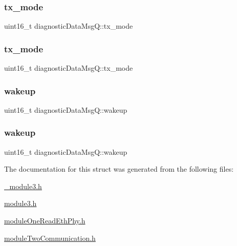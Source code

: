 \subsubsection{\texorpdfstring{tx\+\_\+mode}{tx\_mode}\hspace{0.1cm}{\footnotesize\ttfamily [1/2]}}
{\footnotesize\ttfamily uint16\+\_\+t diagnostic\+Data\+Msg\+Q\+::tx\+\_\+mode}

\mbox{\label{structdiagnostic_data_msg_q_acc9c509a517ee2079aa6ff9de27c61a4}} 
\subsubsection{\texorpdfstring{tx\+\_\+mode}{tx\_mode}\hspace{0.1cm}{\footnotesize\ttfamily [2/2]}}
{\footnotesize\ttfamily uint16\+\_\+t diagnostic\+Data\+Msg\+Q\+::tx\+\_\+mode}

\mbox{\label{structdiagnostic_data_msg_q_a8af90f2f6077250420f9c4830906a82f}} 
\subsubsection{\texorpdfstring{wakeup}{wakeup}\hspace{0.1cm}{\footnotesize\ttfamily [1/2]}}
{\footnotesize\ttfamily uint16\+\_\+t diagnostic\+Data\+Msg\+Q\+::wakeup}

\mbox{\label{structdiagnostic_data_msg_q_a8af90f2f6077250420f9c4830906a82f}} 
\subsubsection{\texorpdfstring{wakeup}{wakeup}\hspace{0.1cm}{\footnotesize\ttfamily [2/2]}}
{\footnotesize\ttfamily uint16\+\_\+t diagnostic\+Data\+Msg\+Q\+::wakeup}



The documentation for this struct was generated from the following files\+:\begin{DoxyCompactItemize}
\item 
\mbox{\hyperlink{__module3_8h}{\+\_\+module3.\+h}}\item 
\mbox{\hyperlink{module3_8h}{module3.\+h}}\item 
\mbox{\hyperlink{module_one_read_eth_phy_8h}{module\+One\+Read\+Eth\+Phy.\+h}}\item 
\mbox{\hyperlink{module_two_communication_8h}{module\+Two\+Communication.\+h}}\end{DoxyCompactItemize}
